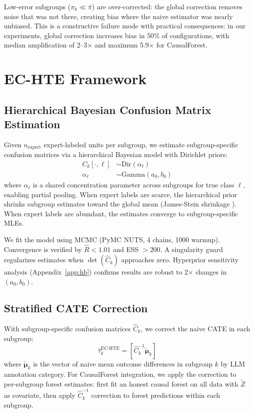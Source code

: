 \documentclass[11pt,twocolumn]{article}
\begin{document}
Low-error subgroups ($\pi_k \ll \bar{\pi}$) are over-corrected: the global correction removes noise that was not there, creating bias where the naive estimator was nearly unbiased. This is a constructive failure mode with practical consequences: in our experiments, global correction increases bias in 50\% of configurations, with median amplification of 2--3$\times$ and maximum 5.9$\times$ for CausalForest.

\section{EC-HTE Framework}
\label{sec:method}

\subsection{Hierarchical Bayesian Confusion Matrix Estimation}

Given $n_{\text{expert}}$ expert-labeled units per subgroup, we estimate subgroup-specific confusion matrices via a hierarchical Bayesian model with Dirichlet priors:
\begin{align}
C_k[\cdot, \ell] &\sim \text{Dir}(\alpha_\ell) \\
\alpha_\ell &\sim \text{Gamma}(a_0, b_0)
\end{align}
where $\alpha_\ell$ is a shared concentration parameter across subgroups for true class $\ell$, enabling partial pooling. When expert labels are scarce, the hierarchical prior shrinks subgroup estimates toward the global mean (James-Stein shrinkage \cite{james1961}). When expert labels are abundant, the estimates converge to subgroup-specific MLEs.

We fit the model using MCMC (PyMC NUTS, 4 chains, 1000 warmup). Convergence is verified by $\hat{R} < 1.01$ and ESS $> 200$. A singularity guard regularizes estimates when $\det(\hat{C}_k)$ approaches zero. Hyperprior sensitivity analysis (Appendix~\ref{app:hb}) confirms results are robust to 2$\times$ changes in $(a_0, b_0)$.

\subsection{Stratified CATE Correction}

With subgroup-specific confusion matrices $\hat{C}_k$, we correct the naive CATE in each subgroup:
\begin{equation}
\hat{\tau}_k^{\text{EC-HTE}} = \left[\hat{C}_k^{-1} \tilde{\boldsymbol{\mu}}_k\right]
\end{equation}
where $\tilde{\boldsymbol{\mu}}_k$ is the vector of naive mean outcome differences in subgroup $k$ by LLM annotation category. For CausalForest integration, we apply the correction to per-subgroup forest estimates: first fit an honest causal forest \cite{wager2018} on all data with $\tilde{Z}$ as covariate, then apply $\hat{C}_k^{-1}$ correction to forest predictions within each subgroup.
\end{document}

